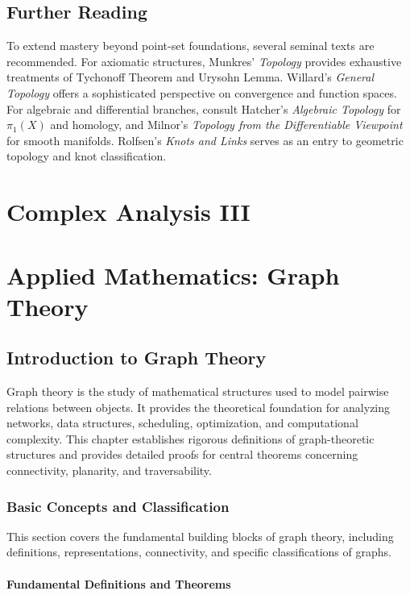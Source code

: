 \documentclass[oneside]{book}
\begin{document}
\section*{Further Reading}
To extend mastery beyond point-set foundations, several seminal texts are recommended. For axiomatic structures, Munkres' \textit{Topology} provides exhaustive treatments of Tychonoff Theorem and Urysohn Lemma. Willard's \textit{General Topology} offers a sophisticated perspective on convergence and function spaces. For algebraic and differential branches, consult Hatcher's \textit{Algebraic Topology} for $\pi_1(X)$ and homology, and Milnor's \textit{Topology from the Differentiable Viewpoint} for smooth manifolds. Rolfsen's \textit{Knots and Links} serves as an entry to geometric topology and knot classification.

\chapter{Complex Analysis III}

\chapter{Applied Mathematics: Graph Theory}

\section{Introduction to Graph Theory}

Graph theory is the study of mathematical structures used to model pairwise relations between objects. It provides the theoretical foundation for analyzing networks, data structures, scheduling, optimization, and computational complexity. This chapter establishes rigorous definitions of graph-theoretic structures and provides detailed proofs for central theorems concerning connectivity, planarity, and traversability.

\subsection{Basic Concepts and Classification}

This section covers the fundamental building blocks of graph theory, including definitions, representations, connectivity, and specific classifications of graphs.

\subsubsection{Fundamental Definitions and Theorems}
\end{document}
